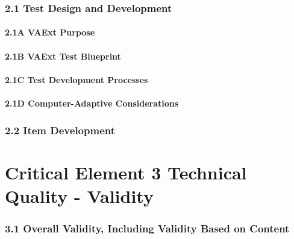 \documentclass[]{book}
\begin{document}
\hypertarget{test-design-and-development}{%
\subsection{2.1 Test Design and Development}\label{test-design-and-development}}

\hypertarget{a-vaext-purpose}{%
\subsubsection{2.1A VAExt Purpose}\label{a-vaext-purpose}}

\hypertarget{b-vaext-test-blueprint}{%
\subsubsection{2.1B VAExt Test Blueprint}\label{b-vaext-test-blueprint}}

\hypertarget{c-test-development-processes}{%
\subsubsection{2.1C Test Development Processes}\label{c-test-development-processes}}

\hypertarget{d-computer-adaptive-considerations}{%
\subsubsection{2.1D Computer-Adaptive Considerations}\label{d-computer-adaptive-considerations}}

\hypertarget{item-development}{%
\subsection{2.2 Item Development}\label{item-development}}

\hypertarget{critical-element-3-technical-quality---validity}{%
\chapter{Critical Element 3 Technical Quality - Validity}\label{critical-element-3-technical-quality---validity}}

\hypertarget{overall-validity-including-validity-based-on-content}{%
\subsection{3.1 Overall Validity, Including Validity Based on Content}\label{overall-validity-including-validity-based-on-content}}
\end{document}

